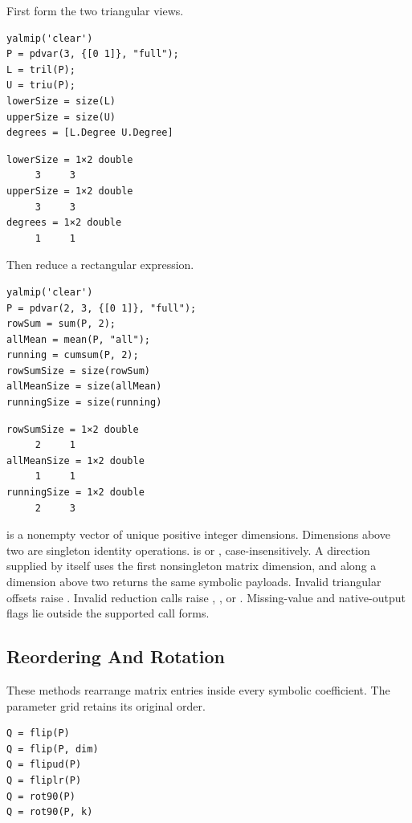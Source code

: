 First form the two triangular views.

\examplehead
\begin{lstlisting}[style=dpmatlab]
yalmip('clear')
P = pdvar(3, {[0 1]}, "full");
L = tril(P);
U = triu(P);
lowerSize = size(L)
upperSize = size(U)
degrees = [L.Degree U.Degree]
\end{lstlisting}

\begin{lstlisting}[style=dpoutput]
lowerSize = 1×2 double
     3     3
upperSize = 1×2 double
     3     3
degrees = 1×2 double
     1     1
\end{lstlisting}

Then reduce a rectangular expression.

\begin{lstlisting}[style=dpmatlab]
yalmip('clear')
P = pdvar(2, 3, {[0 1]}, "full");
rowSum = sum(P, 2);
allMean = mean(P, "all");
running = cumsum(P, 2);
rowSumSize = size(rowSum)
allMeanSize = size(allMean)
runningSize = size(running)
\end{lstlisting}

\begin{lstlisting}[style=dpoutput]
rowSumSize = 1×2 double
     2     1
allMeanSize = 1×2 double
     1     1
runningSize = 1×2 double
     2     3
\end{lstlisting}

 is a nonempty vector of unique positive integer dimensions. Dimensions above two are singleton identity operations.  is  or , case-insensitively. A direction supplied by itself uses the first nonsingleton matrix dimension, and  along a dimension above two returns the same symbolic payloads. Invalid triangular offsets raise . Invalid reduction calls raise , , or . Missing-value and native-output flags lie outside the supported call forms.

\subsection{Reordering And Rotation}
\label{sec:pdvar-matrix-reorder}

These methods rearrange matrix entries inside every symbolic coefficient. The parameter grid retains its original order.

\syntaxhead
\begin{lstlisting}[style=dpsyntax]
Q = flip(P)
Q = flip(P, dim)
Q = flipud(P)
Q = fliplr(P)
Q = rot90(P)
Q = rot90(P, k)
\end{lstlisting}

